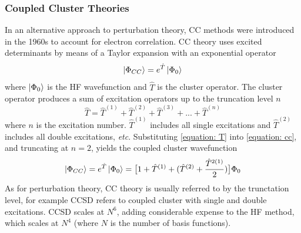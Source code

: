 \subsubsection{Coupled Cluster Theories}
In an alternative approach to perturbation theory, \ac{CC} methods were introduced in the 1960s to account for electron correlation.\cite{Cizek1966,Paldus1972} \ac{CC} theory uses excited determinants by means of a Taylor expansion with an exponential operator
\begin{equation}\label{equation: cc}
    \ket{\Phi_{CC}}=e^{\hat{T}}\ket{\Phi_{0}}
\end{equation}
where $\ket{\Phi_{0}}$ is the \ac{HF} wavefunction and $\hat{T}$ is the cluster operator. The cluster operator produces a sum of excitation operators up to the truncation level $n$
\begin{equation}\label{equation: T}
    \hat{T}=\hat{T}^{(1)}+\hat{T}^{(2)}+\hat{T}^{(3)}+...+\hat{T}^{(n)}
\end{equation}
where $n$ is the excitation number. $\hat{T}^{(1)}$ includes all single excitations and $\hat{T}^{(2)}$ includes all double excitations, \textit{etc}.
Substituting \ref{equation: T} into \ref{equation: cc}, and truncating at $n=2$, yields the coupled cluster wavefunction
\begin{equation}\label{equation: CCwavefunctioncomplete}
\ket{\Phi_{CC}}=e^{\hat{T}}\ket{\Phi_{0}}=\big[1+\hat{T}^{(1)}+(\hat{T}^{(2)}+\frac{\hat{T}^{2(1)}}{2})\big]\Phi_{0}
\end{equation}
As for perturbation theory, \ac{CC} theory is usually referred to by the trunctation level, for example CCSD refers to coupled cluster with single and double excitations. CCSD scales at $N^{6}$, adding considerable expense to the \ac{HF} method, which scales at $N^{4}$ (where $N$ is the number of basis functions).

